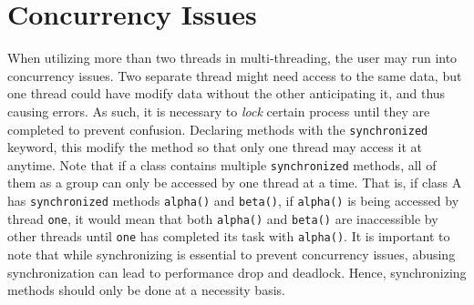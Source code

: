 \documentclass{tufte-handout}
\begin{document}
    \section*{Concurrency Issues}
    When utilizing more than two threads in multi-threading, the user may run into concurrency issues. Two separate thread might need access to the same data, but one thread could have modify data without the other anticipating it, and thus causing errors. As such, it is necessary to \emph{lock} certain process until they are completed to prevent confusion. Declaring methods with the \texttt{synchronized} keyword, this modify the method so that only one thread may access it at anytime. Note that if a class contains multiple \texttt{synchronized} methods, all of them as a group can only be accessed by one thread at a time. That is, if class A has \texttt{synchronized} methods \texttt{alpha()} and \texttt{beta()}, if \texttt{alpha()} is being accessed by thread \texttt{one}, it would mean that both \texttt{alpha()} and \texttt{beta()} are inaccessible by other threads until \texttt{one} has completed its task with \texttt{alpha()}. It is important to note that while synchronizing is essential to prevent concurrency issues, abusing synchronization can lead to performance drop and deadlock. Hence, synchronizing methods should only be done at a necessity basis. 
\end{document}
